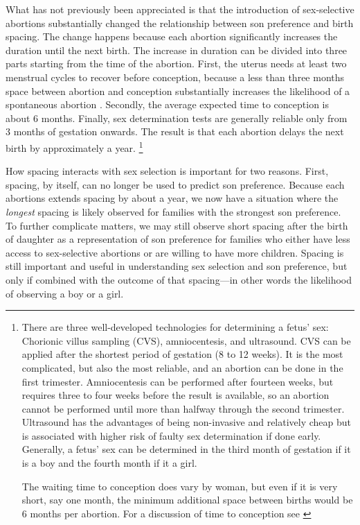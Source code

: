 \documentclass[12pt,letterpaper]{article}
\begin{document}
What has not previously been appreciated is that the introduction of sex-selective 
abortions substantially changed the relationship between son preference and birth spacing.
The change happens because each abortion significantly increases the duration until the
next birth.
The increase in duration can be divided into three parts starting from the time of
the abortion.
First, the uterus needs at least two menstrual cycles to recover 
before conception, because a less than three months space 
between abortion and conception substantially increases the likelihood 
of a spontaneous abortion \citep{zhou00b}.
Secondly, the average expected time to conception is about 6 months.
Finally, sex determination tests are generally reliable only from 3 months of gestation onwards.
The result is that each abortion delays the next birth by approximately a year.%
\footnote{
There are three well-developed technologies for determining a fetus' sex: 
Chorionic villus sampling (CVS), amniocentesis, and ultrasound.
CVS can be applied after the shortest period
of gestation (8 to 12 weeks).
It is the most complicated, but also the most reliable, and an abortion can be done in 
the first trimester.
Amniocentesis can be performed after fourteen weeks, but requires three to four weeks
before the result is available, so an abortion cannot be performed until more than 
halfway through the second trimester.
Ultrasound has the advantages of being non-invasive and relatively cheap but 
is associated with higher risk of faulty sex determination if done early.
Generally, a fetus' sex can be determined in the third month of gestation if it is a
boy and the fourth month if it a girl.

The waiting time to conception does vary by woman, but
even if it is very short, say one  month, the minimum additional space between
births would be 6 months per abortion.
For a discussion of time to conception see \citep{Wang2003}
}

How spacing interacts with sex selection is important for two reasons.
First, 
spacing, by itself, can no longer be used to predict son preference. 
Because each abortions extends spacing by about a year, we now have a situation 
where the \emph{longest} spacing is likely observed for families with the 
strongest son preference.
To further complicate matters, 
we may still observe short spacing after the birth of daughter as a representation 
of son preference for families who either have less access to sex-selective 
abortions or are willing to have more children.
Spacing is still important and useful in understanding sex selection and son
preference, but only if combined with the outcome of that spacing---in other words 
the likelihood of observing a boy or a girl.
\end{document}
